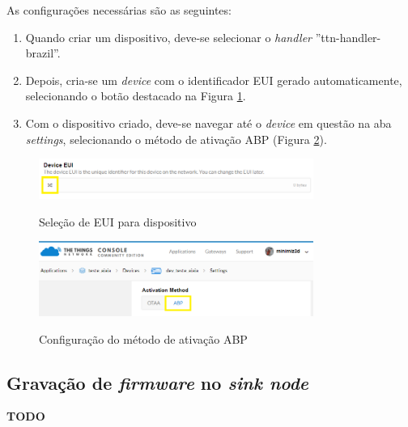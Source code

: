 \documentclass[oneside,openright,12pt]{ufsm_2015} %
\begin{document}
    As configurações necessárias são as seguintes:
    
    \begin{enumerate}
        \item Quando criar um dispositivo, deve-se selecionar o \textit{handler} ''ttn-handler-brazil''.
        \item Depois, cria-se um \textit{device} com o identificador EUI gerado automaticamente, selecionando o botão destacado na Figura \ref{fig:dev-eui-ttn}.
        \item Com o dispositivo criado, deve-se navegar até o \textit{device} em questão na aba \textit{settings}, selecionando o método de ativação ABP (Figura \ref{fig:dev-settings-ttn}).
    \end{enumerate}
    
    \begin{figure}[ht]
 	    \caption{\label{exepretex} Seleção de EUI para dispositivo}
        \centering
        \includegraphics[width=0.8\textwidth]{figuras/device_eui.png}
        \vspace{\baselineskip} %
        \label{fig:dev-eui-ttn}
    \end{figure}
    
    \begin{figure}[ht]
 	    \caption{\label{exepretex} Configuração do método de ativação ABP}
        \centering
        \includegraphics[width=0.8\textwidth]{figuras/device_settings.png}
        \vspace{\baselineskip} %
        \label{fig:dev-settings-ttn}
    \end{figure}
    
    \subsection{Gravação de \textit{firmware} no \textit{sink node}}
    \textbf{TODO}
    
\end{document}
